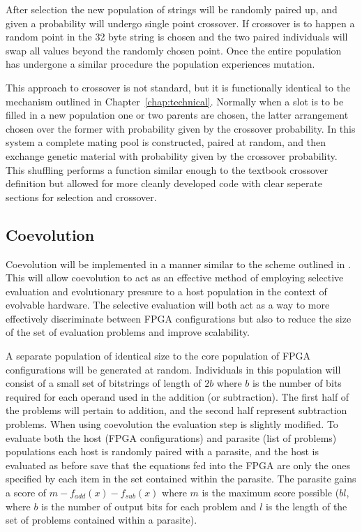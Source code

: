 After selection the new population of strings will be randomly paired up, and given
a probability will undergo single point crossover. If crossover is to happen a
random point in the 32 byte string is chosen and the two paired individuals will
swap all values beyond the randomly chosen point. Once the entire population has
undergone a similar procedure the population experiences mutation.

This approach to crossover is not standard, but it is functionally identical to
the mechanism outlined in Chapter~\ref{chap:technical}. Normally when a slot is
to be filled in a new population one or two parents are chosen, the latter arrangement
chosen over the former with probability given by the crossover probability. In this system a complete
mating pool is constructed, paired at random, and then exchange genetic material with
probability given by the crossover probability. This shuffling performs a function similar
enough to the textbook crossover definition but allowed for more cleanly developed
code with clear seperate sections for selection and crossover.

\subsection{Coevolution}

Coevolution will be implemented in a manner similar to the scheme outlined in
\cite{6790490}.
This will allow coevolution to act as an effective method of employing selective
evaluation and evolutionary pressure to a host population in the context of
evolvable hardware. The selective evaluation will both act as a way to more effectively
discriminate between FPGA configurations but also to reduce the size of the
set of evaluation problems and improve scalability.

A separate population of identical size to the core population of FPGA configurations
will be generated at random. Individuals in this population will consist of a small set
of bitstrings of length of $2b$ where $b$ is the number of bits required for
each operand used in the addition (or subtraction). The first half of the problems
will pertain to addition, and the second half represent subtraction problems.
When using coevolution the
evaluation step is slightly modified. To evaluate both the host (FPGA
configurations) and parasite (list of problems) populations each host is randomly
paired with a parasite, and the host is evaluated as before save that the equations
fed into the FPGA are only the ones specified by each item in the set contained within
the parasite. The parasite gains a score of $m - f_{add}(x) - f_{sub}(x)$ where
$m$ is the maximum score possible ($bl$, where $b$ is the number of output bits for
each problem and $l$ is the length of the set of problems contained within a
parasite).

